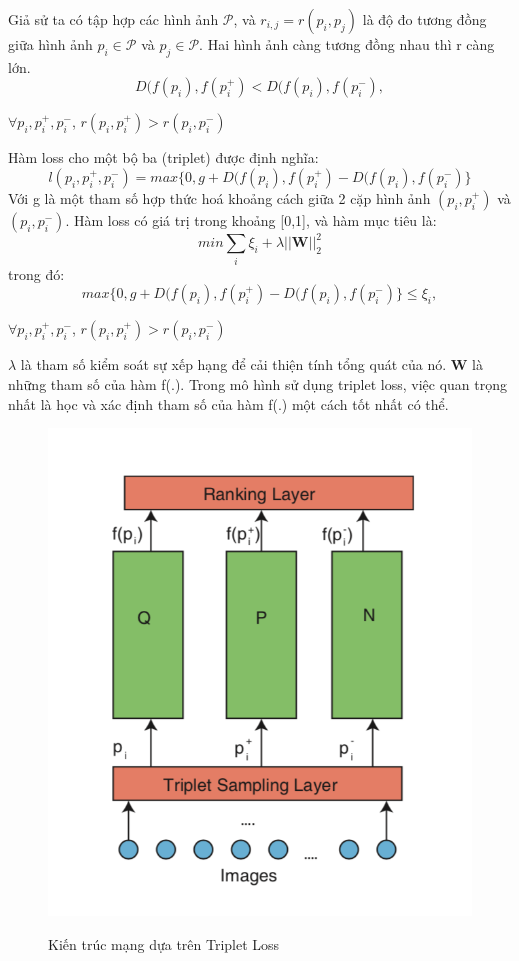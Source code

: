 \documentclass[a4paper,14pt]{extreport}
\begin{document}
Giả sử ta có tập hợp các hình ảnh $\mathcal{P}$, và $r_{i,j} = r(p_i,p_j)$ là độ đo tương đồng giữa hình ảnh $p_i \in \mathcal{P}$ và $p_j \in \mathcal{P}$. Hai hình ảnh càng tương đồng nhau thì r càng lớn.
\[ D(f(p_i),f(p_i^{+}) < D(f(p_i),f(p_i^{-}),\]
\begin{center}$\forall{p_i,p_i^{+},p_i^{-}}$, $r(p_i,p_i^{+}) > r(p_i,p_i^{-})$ \end{center}
Hàm loss cho một bộ ba (triplet) được định nghĩa:
\[l(p_i,p_i^{+},p_i^{-}) = max\{0, g + D(f(p_i),f(p_i^{+}) - D(f(p_i),f(p_i^{-})\}\]
Với g là một tham số hợp thức hoá khoảng cách giữa 2 cặp hình ảnh $(p_i,p_i^{+})$ và $(p_i,p_i^{-})$. Hàm loss có giá trị trong khoảng [0,1], và hàm mục tiêu là:
\[min \sum_{i}\xi_i + \lambda ||\mathbf{W}||_2^2\]
trong đó: \[max\{0, g + D(f(p_i),f(p_i^{+}) - D(f(p_i),f(p_i^{-})\} \leq \xi_i,\]
\begin{center}$\forall{p_i,p_i^{+},p_i^{-}}$, $r(p_i,p_i^{+}) > r(p_i,p_i^{-})$ \end{center}
$\lambda$ là tham số kiểm soát sự xếp hạng để cải thiện tính tổng quát của nó. $\mathbf{W}$ là những tham số của hàm f(.). Trong mô hình sử dụng triplet loss, việc quan trọng nhất là học và xác định tham số của hàm f(.) một cách tốt nhất có thể.


\begin{figure}  
    \centering
    \includegraphics[scale=0.8]{img/triplet.png}
    \caption{Kiến trúc mạng dựa trên Triplet Loss}
    \cite{paper-5}
    \label{fig:triplet}
\end{figure}
\end{document}
